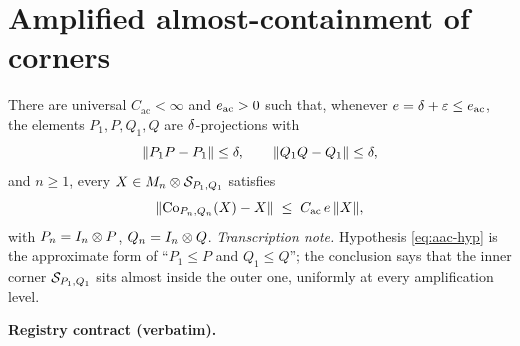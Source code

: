 \section{Amplified almost-containment of corners}\label{sec:compcb-amplified-almost-containment}

\begin{lemma}\label{lem:compcb-amplified-almost-containment}
There are universal $C_{\mathrm{ac}}<\infty$ and $e_{\mathrm{ac}}>0$ such that,
whenever $e=\delta+\varepsilon\le e_{\mathrm{ac}}$, the elements $P_1,P,Q_1,Q$ are
$\delta$-projections with
\begin{equation}\label{eq:aac-hyp}
  \lVert P_1P-P_1\rVert\le\delta,\qquad \lVert Q_1Q-Q_1\rVert\le\delta,
\end{equation}
and $n\ge1$, every $X\in M_{n}\otimes \mathcal S_{P_1,Q_1}$ satisfies
\begin{equation}\label{eq:aac-main}
  \lVert \mathrm{Co}_{P_n,Q_n}(X)-X\rVert\;\le\;C_{\mathrm{ac}}\,e\,\lVert X\rVert,
\end{equation}
with $P_n=I_{n}\otimes P$, $Q_n=I_{n}\otimes Q$.
\emph{Transcription note.} Hypothesis \eqref{eq:aac-hyp} is the approximate form of
``$P_1\le P$ and $Q_1\le Q$''; the conclusion says that the inner corner
$\mathcal S_{P_1,Q_1}$ sits almost inside the outer one, uniformly at every amplification
level.
\end{lemma}

\noindent\textbf{Registry contract (verbatim).}

